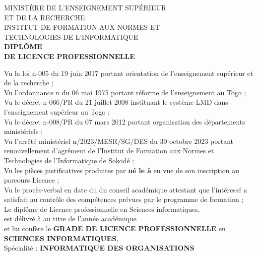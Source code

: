 \documentclass[a4paper, landscape, 10pt]{article}
\date{}
\title{}
\newcommand\BackgroundPic{
\put(-4,0){
\parbox[b][\paperheight]{\paperwidth}{
\texttt{[image: fond\_diplome\_haut]}
}}}
\begin{document}
\AddToShipoutPicture*{\BackgroundPic}
\maketitle
\vspace{-4.5cm}

\begin{center}
\large
MINISTÈRE DE L'ENSEIGNEMENT SUPÉRIEUR\\
ET DE LA RECHERCHE\\
\vspace{0.5cm}
INSTITUT DE FORMATION AUX NORMES ET\\
TECHNOLOGIES DE L'INFORMATIQUE\\
\vspace{0.5cm}
\LARGE
\textbf{DIPLÔME\\
DE LICENCE PROFESSIONNELLE}\\
\end{center}
\vspace{0.5cm}
\noindent
Vu la loi n-005 du 19 juin 2017 portant orientation de l’enseignement supérieur et de la recherche ;\\
Vu l’ordonnance n du 06 mai 1975 portant réforme de l’enseignement au Togo ;\\
Vu le décret n-066/PR du 21 juillet 2008 instituant le système LMD dans l’enseignement supérieur au Togo ;\\
Vu le décret n-008/PR du 07 mars 2012 portant organisation des départements ministériels ;\\
Vu l'arrêté ministériel n/2023/MESR/SG/DES du 30 octobre 2023 portant renouvellement d'agrément de l'Institut de Formation aux Normes et Technologies de l’Informatique de Sokodé ;\\
Vu les pièces justificatives produites par \textbf{  \textbf{} né le  à } en vue de son inscription au parcours Licence ;\\
Vu le procès-verbal en date du  \hspace{0.15cm}du conseil académique attestant que l'intéressé a satisfait au contrôle des compétences prévues par le programme de formation ;\\

\noindent
Le diplôme de Licence professionnelle en Sciences informatiques,\\
est délivré à \textbf{} au titre de l'année académique \\
et lui confère le \textbf{GRADE DE LICENCE PROFESSIONNELLE} en \textbf{SCIENCES INFORMATIQUES},\\
Spécialité : \textbf{INFORMATIQUE DES ORGANISATIONS}\\
\end{document}
